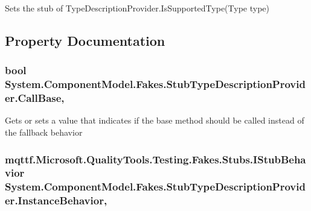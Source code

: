 Sets the stub of Type\-Description\-Provider.\-Is\-Supported\-Type(\-Type type)



\subsection{Property Documentation}
\hypertarget{class_system_1_1_component_model_1_1_fakes_1_1_stub_type_description_provider_a17d9ff3c335afbaaa584839a4d3c1b7a}{
\subsubsection[{Call\-Base}]{\setlength{\rightskip}{0pt plus 5cm}bool System.\-Component\-Model.\-Fakes.\-Stub\-Type\-Description\-Provider.\-Call\-Base\hspace{0.3cm}{\ttfamily [get]}, {\ttfamily [set]}}}\label{class_system_1_1_component_model_1_1_fakes_1_1_stub_type_description_provider_a17d9ff3c335afbaaa584839a4d3c1b7a}


Gets or sets a value that indicates if the base method should be called instead of the fallback behavior

\hypertarget{class_system_1_1_component_model_1_1_fakes_1_1_stub_type_description_provider_a54b42f8ce919d883516010f1d9e6a2d5}{
\subsubsection[{Instance\-Behavior}]{\setlength{\rightskip}{0pt plus 5cm}mqttf.\-Microsoft.\-Quality\-Tools.\-Testing.\-Fakes.\-Stubs.\-I\-Stub\-Behavior System.\-Component\-Model.\-Fakes.\-Stub\-Type\-Description\-Provider.\-Instance\-Behavior\hspace{0.3cm}{\ttfamily [get]}, {\ttfamily [set]}}}\label{class_system_1_1_component_model_1_1_fakes_1_1_stub_type_description_provider_a54b42f8ce919d883516010f1d9e6a2d5}


